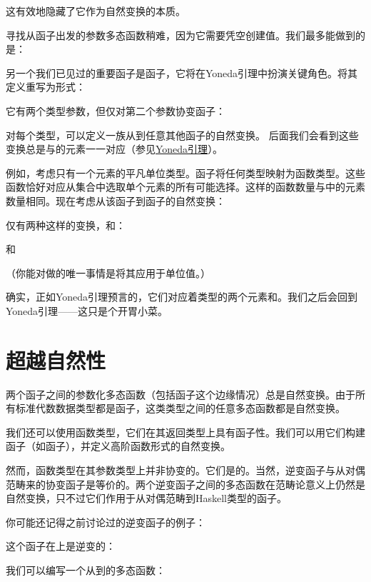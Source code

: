 这有效地隐藏了它作为自然变换的本质。

寻找从函子出发的参数多态函数稍难，因为它需要凭空创建值。我们最多能做到的是：

另一个我们已见过的重要函子是函子，它将在Yoneda引理中扮演关键角色。将其定义重写为形式：

它有两个类型参数，但仅对第二个参数协变函子：

对每个类型，可以定义一族从到任意其他函子的自然变换。
后面我们会看到这些变换总是与的元素一一对应（参见\hyperref[the-yoneda-lemma]{Yoneda引理}）。

例如，考虑只有一个元素\code{()}的平凡单位类型\code{()}。函子将任何类型映射为函数类型。这些函数恰好对应从集合中选取单个元素的所有可能选择。这样的函数数量与中的元素数量相同。现在考虑从该函子到函子的自然变换：

仅有两种这样的变换，和：

和

（你能对做的唯一事情是将其应用于单位值\code{()}。）

确实，正如Yoneda引理预言的，它们对应着类型的两个元素和。我们之后会回到Yoneda引理——这只是个开胃小菜。

\section{超越自然性}

两个函子之间的参数化多态函数（包括函子这个边缘情况）总是自然变换。由于所有标准代数数据类型都是函子，这类类型之间的任意多态函数都是自然变换。

我们还可以使用函数类型，它们在其返回类型上具有函子性。我们可以用它们构建函子（如函子），并定义高阶函数形式的自然变换。

然而，函数类型在其参数类型上并非协变的。它们是的。当然，逆变函子与从对偶范畴来的协变函子是等价的。两个逆变函子之间的多态函数在范畴论意义上仍然是自然变换，只不过它们作用于从对偶范畴到Haskell类型的函子。

你可能还记得之前讨论过的逆变函子的例子：

这个函子在上是逆变的：

我们可以编写一个从到的多态函数：

